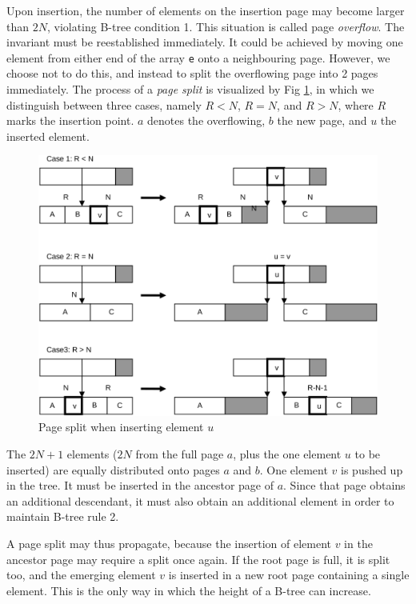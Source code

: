 Upon insertion, the number of elements on the insertion page may become larger than $2N$, violating
B-tree condition 1. This situation is called page \emph{overflow}. The invariant must be reestablished
immediately. It could be achieved by moving one element from either end of the array \verb|e| onto a
neighbouring page. However, we choose not to do this, and instead to split the overflowing page into 2
pages immediately. The process of a \emph{page split} is visualized by Fig \ref{fig:page-split},
in which we distinguish between three cases, namely $R < N$, $R = N$, and $R > N$, where $R$ marks
the insertion point. $a$ denotes the overflowing, $b$ the new page, and $u$ the inserted element.
\begin{figure}
  \centering
  \includegraphics[width=.95\textwidth]{i/o}
  \caption{Page split when inserting element $u$}
  \label{fig:page-split}
\end{figure}

The $2N + 1$ elements ($2N$ from the full page $a$, plus the one element $u$ to be inserted) are equally
distributed onto pages $a$ and $b$. One element $v$ is pushed up in the tree. It must be inserted in the
ancestor page of $a$. Since that page obtains an additional descendant, it must also obtain an
additional element in order to maintain B-tree rule 2.

A page split may thus propagate, because the insertion of element $v$ in the ancestor page may
require a split once again. If the root page is full, it is split too, and the emerging element $v$ is
inserted in a new root page containing a single element. This is the only way in which the height
of a B-tree can increase.

